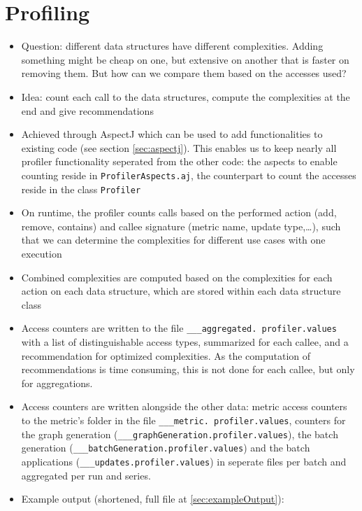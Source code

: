 \section{Profiling}
	\begin{itemize}
		\item Question: different data structures have different complexities. Adding something
			might be cheap on one, but extensive on another that is faster on removing them. But
			how can we compare them based on the accesses used?
		\item Idea: count each call to the data structures, compute the complexities at the
			end and give recommendations
		\item Achieved through AspectJ which can be used to add functionalities to existing code
			(see section \ref{sec:aspectj}). This enables us to keep nearly all profiler
			functionality seperated from the other code: the aspects to enable counting reside in
			\texttt{ProfilerAspects.aj}, the counterpart to count the accesses reside in
			the class \texttt{Profiler}
		\item On runtime, the profiler counts calls based on the performed action (add, remove,
			contains) and callee signature (metric name, update type,\ldots), such that we can
			determine the complexities for different use cases with one execution
		\item Combined complexities are computed based on the complexities for each action on
			each data structure, which are stored within each data structure class
		\item Access counters are written to the file \texttt{\_\_\_aggregated.\allowbreak
			profiler.\allowbreak values} with a list of distinguishable access types, summarized
			for each callee, and a recommendation for optimized complexities. As the computation of
			recommendations is time consuming, this is not done for each callee, but only for
			aggregations.
		\item Access counters are written alongside the other data: metric access counters to
			the metric's folder in the file \texttt{\_\_\_metric.\allowbreak
			profiler.\allowbreak values}, counters for the graph generation
			(\texttt{\_\_\_graphGeneration.\allowbreak profiler.\allowbreak values}), the batch
			generation (\texttt{\_\_\_batchGeneration.\allowbreak profiler.\allowbreak values}) and the batch
			applications (\texttt{\_\_\_updates.\allowbreak profiler.\allowbreak values}) in seperate files per
			batch and aggregated per run and series.
		\item Example output (shortened, full file at \ref{sec:exampleOutput}):
			

\end{itemize}
